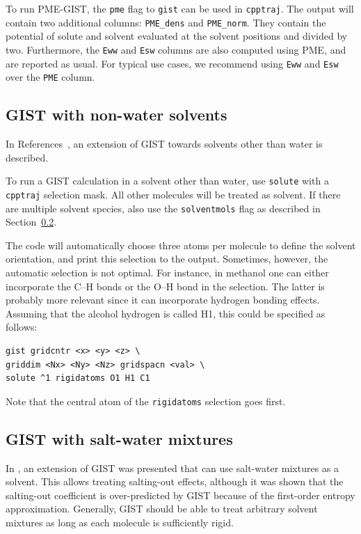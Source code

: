 \documentclass[9pt,tutorial]{livecoms}
\newcommand{\software}{\texttt}
\newcommand\inlinecode{\texttt}
\begin{document}
To run PME-GIST, the \inlinecode{pme} flag to \inlinecode{gist} can be used in \software{cpptraj}.
The output will contain two additional columns: \inlinecode{PME\_dens} and \inlinecode{PME\_norm}.
They contain the potential of solute and solvent evaluated at the solvent positions and divided by two.
Furthermore, the \inlinecode{Eww} and \inlinecode{Esw} columns are also computed using PME, and are reported as usual.
For typical use cases, we recommend using \inlinecode{Eww} and \inlinecode{Esw} over the \inlinecode{PME} column.
\subsection{GIST with non-water solvents}
In References~\cite{Kraml2020,Kamenik2020-gist-macrocycles,Waibl2022-gist-solvents}, an extension of GIST towards solvents other than water is described.

To run a GIST calculation in a solvent other than water, use \inlinecode{solute} with a \software{cpptraj} selection mask.
All other molecules will be treated as solvent.
If there are multiple solvent species, also use the \inlinecode{solventmols} flag as described in Section~\ref{sec-salt-water}.

The code will automatically choose three atoms per molecule to define the solvent orientation, and print this selection to the output.
Sometimes, however, the automatic selection is not optimal.
For instance, in methanol one can either incorporate the C--H bonds or the O--H bond in the selection.
The latter is probably more relevant since it can incorporate hydrogen bonding effects.
Assuming that the alcohol hydrogen is called H1, this could be specified as follows:

\begin{lstlisting}[style=cpptraj]
gist gridcntr <x> <y> <z> \
griddim <Nx> <Ny> <Nz> gridspacn <val> \
solute ^1 rigidatoms O1 H1 C1
\end{lstlisting}

Note that the central atom of the \inlinecode{rigidatoms} selection goes first.

\subsection{GIST with salt-water mixtures}
\label{sec-salt-water}
In \cite{Waibl2021-gist-salt}, an extension of GIST was presented that can use salt-water mixtures as a solvent.
This allows treating salting-out effects, although it was shown that the salting-out coefficient is over-predicted by GIST because of the first-order entropy approximation.
Generally, GIST should be able to treat arbitrary solvent mixtures as long as each molecule is sufficiently rigid.
\end{document}
